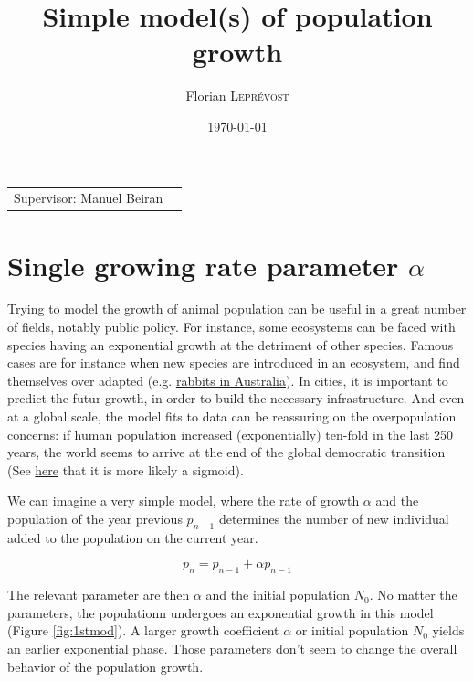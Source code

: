 \documentclass{article}
\title{Simple model(s) of population growth} %
\author{Florian \textsc{Leprévost}} %
\date{\today} %
\begin{document}
\maketitle %

\begin{center}
\begin{tabular}{l r}
Supervisor: Manuel Beiran %
\end{tabular}
\end{center}



\section{Single growing rate parameter $\alpha$}

Trying to model the growth of animal population can be useful in a great number of fields, notably public policy. For instance, some ecosystems can be faced with species having an exponential growth at the detriment of other species. Famous cases are for instance when new species are introduced in an ecosystem, and find themselves over adapted (e.g. \href{https://en.wikipedia.org/wiki/Rabbits_in_Australia}{\color{blue}rabbits in Australia}). In cities, it is important to predict the futur growth, in order to build the necessary infrastructure. And even at a global scale, the model fits to data can be reassuring on the overpopulation concerns: if human population increased (exponentially) ten-fold in the last 250 years, the world seems to arrive at the end of the global democratic transition (See \href{https://ourworldindata.org/world-population-growth-past-future}{\color{blue}here} that it is more likely a sigmoid).



We can imagine a very simple model, where the rate of growth $\alpha$ and the population of the year previous $p_{n-1}$ determines the number of new individual added to the population on the current year.

\begin{equation}\label{dyn}
p_n = p_{n-1} + \alpha p_{n-1}
\end{equation}


The relevant parameter are then $\alpha$ and the initial population $N_0$. No matter the parameters, the populationn undergoes an exponential growth in this model (Figure \ref{fig:1stmod}). A larger growth coefficient $\alpha$ or initial population $N_0$ yields an earlier exponential phase. Those parameters don't seem to change the overall behavior of the population growth.
\end{document}
